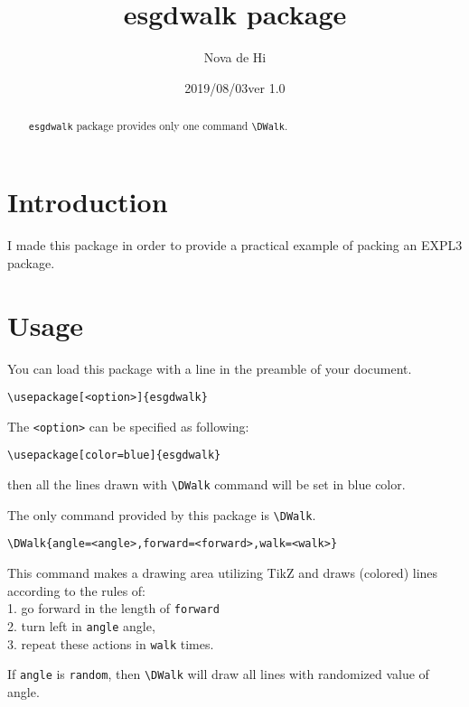 \documentclass[nokorean]{oblivoir}
\newcommand*\esgdwalkdate {2019/08/03}
\newcommand*\esgdwalkversion {1.0}
\begin{document}
\title{esgdwalk package}
\author{Nova de Hi}
\date{\esgdwalkdate\quad ver \esgdwalkversion}

\maketitle

\begin{abstract}
\texttt{esgdwalk} package provides only one command \verb|\DWalk|.
\end{abstract}

\tableofcontents

\section{Introduction}

I made this package in order to provide a practical example of
packing an EXPL3 package. 

\section{Usage}

You can load this package with a line in the preamble of your document.
\begin{verbatim}
\usepackage[<option>]{esgdwalk}
\end{verbatim}

The \texttt{<option>} can be specified as following:
\begin{verbatim}
\usepackage[color=blue]{esgdwalk}
\end{verbatim}
then all the lines drawn with \verb|\DWalk| command will be set in blue color.

The only command provided by this package is \verb|\DWalk|.

\begin{verbatim}
\DWalk{angle=<angle>,forward=<forward>,walk=<walk>}
\end{verbatim}

This command makes a drawing area utilizing TikZ and draws (colored) lines according to
the rules of:\\
1. go forward in the length of \texttt{forward}\\
2. turn left in \texttt{angle} angle, \\
3. repeat these actions in \texttt{walk} times.

If \texttt{angle} is \verb|random|, then \verb|\DWalk| will
draw all lines with randomized value of angle.
\end{document}
